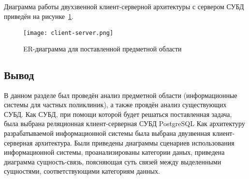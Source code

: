Диаграмма работы двухзвенной клиент-серверной архитектуры с сервером СУБД приведён на рисунке~\ref{fig:client-server}.


\begin{figure}[h!]
	\centering
	\captionsetup{justification=centering}
	\texttt{[image: client-server.png]}
	\caption{ER-диаграмма для поставленной предметной области}
	\label{fig:client-server}
\end{figure}

\subsection*{Вывод}
В данном разделе был проведён анализ предметной области (информационные системы для частных поликлиник), а также провдён анализ существующих СУБД. 
Как СУБД, при помощи которой будет решаться поставленная задача, была выбрана реляционная клиент-серверная СУБД PostgreSQL
Как архитектуру разрабатываемой информационной системы была выбрана двузвенная клиент-серверная архитектура. 
Были приведены диаграммы сценариев использования информационной системы, проанализированы категории даных, приведена диаграмма сущность-связь, поясняющая суть связей между выделенными сущностями, соответствующими категориям данных.


